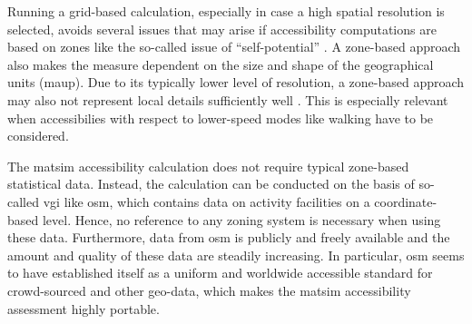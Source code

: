 Running a grid-based calculation, especially in case a high spatial resolution is selected, avoids several issues
that may arise if accessibility computations are based on zones like the so-called issue of ``self-potential''
\citep[see, e.g.,][]{NicolaiNagelHiResAccessibilityMethod}. A zone-based approach also makes the 
measure dependent on the size and shape of the geographical units (\cf \gls{maup}). 
Due to its typically lower level of resolution, a zone-based approach may also not represent local details
sufficiently well \citep{Kwan1998PointBasedAccessibility}. This is especially relevant
when accessibilies with respect to lower-speed modes like walking have to be considered.

The \gls{matsim} accessibility calculation does not require typical zone-based statistical data. Instead, the
calculation can be conducted on the basis of so-called \gls{vgi} like \gls{osm}, which contains data on
activity facilities on a coordinate-based level. Hence, no reference to any zoning
system is necessary when using these data. Furthermore, data from \gls{osm} is publicly and freely available 
and the amount and quality of these data are steadily increasing. In particular, \gls{osm} seems to have 
established itself as a uniform and worldwide accessible standard for crowd-sourced and other geo-data, 
which makes the \gls{matsim} accessibility assessment highly portable.

